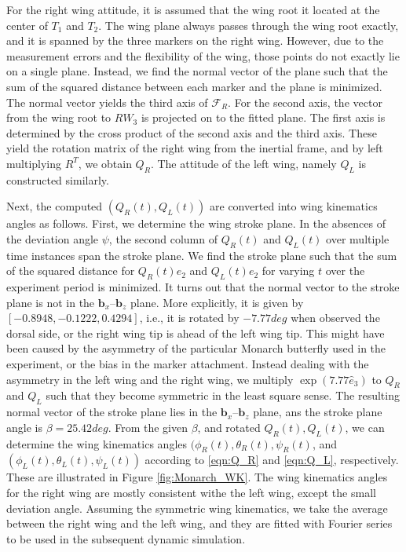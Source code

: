 \documentclass[10pt]{article}
\begin{document}
For the right wing attitude, it is assumed that the wing root it located at the center of $T_1$ and $T_2$.
The wing plane always passes through the wing root exactly, and it is spanned by the three markers on the right wing. 
However, due to the measurement errors and the flexibility of the wing, those points do not exactly lie on a single plane. 
Instead, we find the normal vector of the plane such that the sum of the squared distance between each marker and the plane is minimized. 
The normal vector yields the third axis of $\mathcal{F}_R$. 
For the second axis, the vector from the wing root to $RW_3$ is projected on to the fitted plane. 
The first axis is determined by the cross product of the second axis and the third axis. 
These yield the rotation matrix of the right wing from the inertial frame, and by left multiplying $R^T$, we obtain $Q_R$. 
The attitude of the left wing, namely $Q_L$ is constructed similarly. 

Next, the computed $(Q_R(t),Q_L(t))$ are converted into wing kinematics angles as follows. 
First, we determine the wing stroke plane. 
In the absences of the deviation angle $\psi$, the second column of $Q_R(t)$ and $Q_L(t)$ over multiple time instances span the stroke plane. 
We find the stroke plane such that the sum of the squared distance for $Q_R(t) e_2$ and $Q_L(t) e_2$ for varying $t$ over the experiment period is minimized. 
It turns out that the normal vector to the stroke plane is not in the $\mathbf{b}_x$--$\mathbf{b}_z$ plane. 
More explicitly, it is given by $[   -0.8948, -0.1222, 0.4294]$, i.e., it is rotated by $-7.77\si{deg}$ when observed the dorsal side,
or the right wing tip is ahead of the left wing tip.
This might have been caused by the asymmetry of the particular Monarch butterfly used in the experiment, or the bias in the marker attachment.
Instead dealing with the asymmetry in the left wing and the right wing, we multiply $\exp(7.77\hat e_3)$ to $Q_R$ and $Q_L$ such that they become symmetric in the least square sense. 
The resulting normal vector of the stroke plane lies in the $\mathbf{b}_x$--$\mathbf{b}_z$ plane, ans the stroke plane angle is $\beta = 25.42\si{deg}$.
From the given $\beta$, and rotated $Q_R(t),Q_L(t)$, we can determine the wing kinematics angles $(\phi_R(t),\theta_R(t),\psi_R(t)$, and $(\phi_L(t),\theta_L(t),\psi_L(t))$ according to \eqref{eqn:Q_R} and \eqref{eqn:Q_L}, respectively. 
These are illustrated in Figure \ref{fig:Monarch_WK}.
The wing kinematics angles for the right wing are mostly consistent withe the left wing, except the small deviation angle. 
Assuming the symmetric wing kinematics, we take the average between the right wing and the left wing, 
and they are fitted with Fourier series to be used in the subsequent dynamic simulation. 
\end{document}
